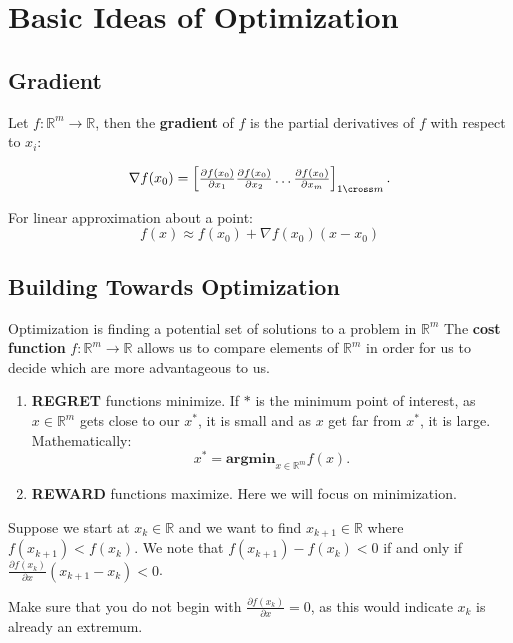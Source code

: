 \chapter{Basic Ideas of Optimization}
\section{Gradient}
Let \(f: \mathbb{R}^m \to \mathbb{R} \), then the \textbf{gradient} of \(f\) is the partial derivatives of \(f\) with respect to \(x_i\):
\begin{definition}
  \[
    \nabla f(x_0) =
    \begin{bmatrix}
      \frac{\partial f(x_0)}{\partial x_1} \frac{\partial f(x_0)}{\partial x_2} \ldots \frac{\partial f(x_0)}{\partial x_m}
    \end{bmatrix}_{1 \cross m}.
  \] 
\end{definition}
For linear approximation about a point:
\[
  f(x) \approx f(x_0) + \nabla f(x_0) (x - x_0)
\]

\section{Building Towards Optimization}
Optimization is finding a potential set of solutions to a problem in \(\mathbb{R} ^m\) The \textbf{cost function} \(f: \mathbb{R} ^m \to \mathbb{R} \) allows us to compare elements of \(\mathbb{R} ^m\) in order for us to decide which are more advantageous to us.

\begin{enumerate}
  \item \textbf{REGRET} functions minimize. If \(*\) is the minimum point of interest, as \(x \in \mathbb{R} ^m\)  gets close to our \(x^*\), it is small and as \(x\) get far from \(x^*\), it is large. Mathematically:
  \[
    x^* = \mathbf{argmin}_{x \in \mathbb{R}^m} f(x).
  \]
  \item \textbf{REWARD} functions maximize. Here we will focus on minimization.
\end{enumerate}

Suppose we start at \(x_k \in \mathbb{R} \) and we want to find \(x_{k +1} \in \mathbb{R}\) where \(f(x_{k+1}) < f(x_k)\). We note that \(f(x_{k+1}) - f(x_k) < 0\) if and only if \(\frac{\partial f(x_k)}{\partial x} (x_{k+1}-x_k) < 0\).

\begin{remark}
  Make sure that you do not begin with \(\frac{\partial f(x_k)}{\partial x} = 0\), as this would indicate \(x_k\) is already an extremum.
\end{remark}

